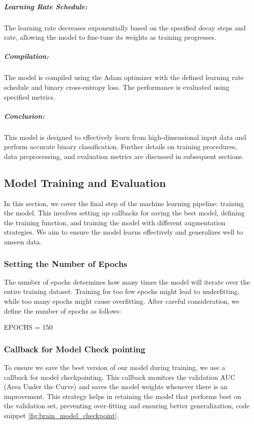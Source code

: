 \subparagraph{Learning Rate Schedule:}

The learning rate decreases exponentially based on the specified decay steps and rate, allowing the model to fine-tune its weights as training progresses.

\subparagraph{Compilation:}

The model is compiled using the Adam optimizer with the defined learning rate schedule and binary cross-entropy loss. The performance is evaluated using specified metrics.

\subparagraph{Conclusion:}

This model is designed to effectively learn from high-dimensional input data and perform accurate binary classification. Further details on training procedures, data preprocessing, and evaluation metrics are discussed in subsequent sections.

\subsection{Model Training and Evaluation}

In this section, we cover the final step of the machine learning pipeline: training the model. This involves setting up callbacks for saving the best model, defining the training function, and training the model with different augmentation strategies. We aim to ensure the model learns effectively and generalizes well to unseen data.

\subsubsection{Setting the Number of Epochs}

The number of epochs determines how many times the model will iterate over the entire training dataset. Training for too few epochs might lead to underfitting, while too many epochs might cause overfitting. After careful consideration, we define the number of epochs as follows:

EPOCHS = 150

\subsubsection{Callback for Model Check pointing}

To ensure we save the best version of our model during training, we use a callback for model checkpointing. This callback monitors the validation AUC (Area Under the Curve) and saves the model weights whenever there is an improvement. This strategy helps in retaining the model that performs best on the validation set, preventing over-fitting and ensuring better generalization, code snippet \ref{fig:brain_model_checkpoint}.

